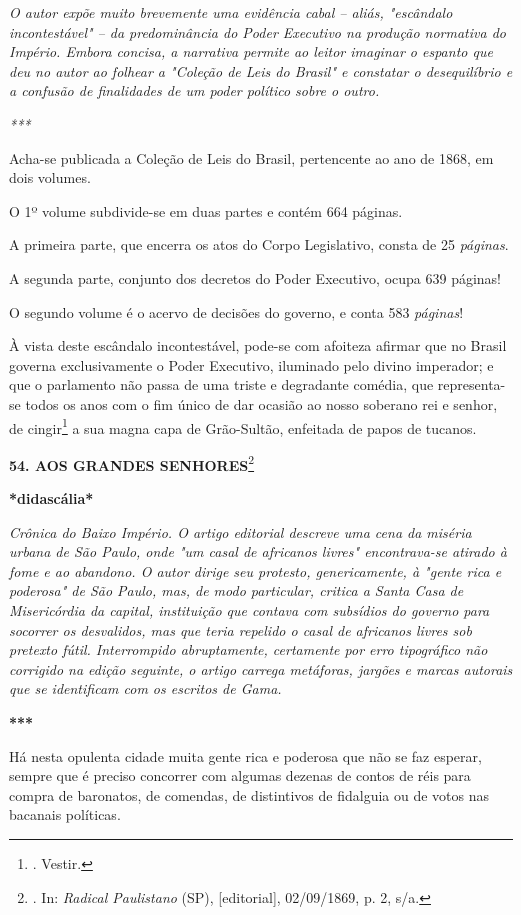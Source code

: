\emph{O autor expõe muito brevemente uma evidência cabal -- aliás,
"escândalo incontestável" -- da predominância do Poder Executivo na
produção normativa do Império. Embora concisa, a narrativa permite ao
leitor imaginar o espanto que deu no autor ao folhear a "Coleção de Leis
do Brasil" e constatar o desequilíbrio e a confusão de finalidades de um
poder político sobre o outro.}

\emph{***}

Acha-se publicada a Coleção de Leis do Brasil, pertencente ao ano de
1868, em dois volumes.

O 1º volume subdivide-se em duas partes e contém 664 páginas.

A primeira parte, que encerra os atos do Corpo Legislativo, consta de 25
\emph{páginas}.

A segunda parte, conjunto dos decretos do Poder Executivo, ocupa 639
páginas!

O segundo volume é o acervo de decisões do governo, e conta 583
\emph{páginas}!

À vista deste escândalo incontestável, pode-se com afoiteza afirmar que
no Brasil governa exclusivamente o Poder Executivo, iluminado pelo
divino imperador; e que o parlamento não passa de uma triste e
degradante comédia, que representa-se todos os anos com o fim único de
dar ocasião ao nosso soberano rei e senhor, de cingir\footnote{. Vestir.}
a sua magna capa de Grão-Sultão, enfeitada de papos de tucanos.

\textbf{54. AOS GRANDES SENHORES}\footnote{. In: \emph{Radical
  Paulistano} (SP), {[}editorial{]}, 02/09/1869, p. 2, s/a.}

\textbf{*didascália*}

\emph{Crônica do Baixo Império. O artigo editorial descreve uma cena da
miséria urbana de São Paulo, onde "um casal de africanos livres"
encontrava-se atirado à fome e ao abandono. O autor dirige seu protesto,
genericamente, à "gente rica e poderosa" de São Paulo, mas, de modo
particular, critica a Santa Casa de Misericórdia da capital, instituição
que contava com subsídios do governo para socorrer os desvalidos, mas
que teria repelido o casal de africanos livres sob pretexto fútil.
Interrompido abruptamente, certamente por erro tipográfico não corrigido
na edição seguinte, o artigo carrega metáforas, jargões e marcas
autorais que se identificam com os escritos de Gama.}

\textbf{***}

Há nesta opulenta cidade muita gente rica e poderosa que não se faz
esperar, sempre que é preciso concorrer com algumas dezenas de contos de
réis para compra de baronatos, de comendas, de distintivos de fidalguia
ou de votos nas bacanais políticas.

